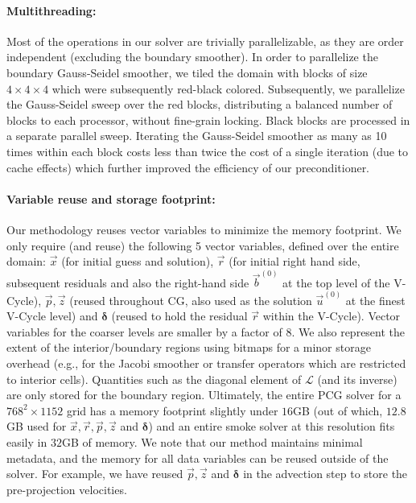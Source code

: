 \paragraph{Multithreading:} Most of the operations in our solver are trivially parallelizable, as they are order independent (excluding the boundary smoother). In order to parallelize the boundary Gauss-Seidel smoother, we tiled the domain with blocks of size $4\times 4\times 4$ which were subsequently red-black
colored. Subsequently, we parallelize the Gauss-Seidel sweep over the red blocks, distributing a balanced number of blocks to each processor, without fine-grain locking. Black blocks are
processed in a separate parallel sweep. 
Iterating the Gauss-Seidel smoother as many as 10 times within each block costs less than twice
the cost of a single iteration (due to cache effects) which further improved the efficiency of our preconditioner.

\paragraph{Variable reuse and storage footprint:} Our methodology reuses vector variables to minimize the memory footprint. We only
require (and reuse) the following 5 vector variables, defined over the entire domain: $\vec{x}$ (for initial guess and solution), $\vec{r}$ (for initial right hand side, subsequent residuals and also
the right-hand side $\vec{b}^{(0)}$ at the top level of the V-Cycle), $\vec{p},\vec{z}$ (reused throughout CG, also used as the solution $\vec{u}^{(0)}$ at the finest V-Cycle level)
and $\boldsymbol{\delta}$ (reused to hold the residual $\vec{r}$ within the V-Cycle). Vector variables
for the coarser levels are smaller by a factor of 8. We also represent the extent of the interior/boundary regions using bitmaps
for a minor storage overhead (e.g., for the Jacobi smoother or transfer operators which are restricted to interior cells). Quantities such as the diagonal element of $\mathcal{L}$ (and
its inverse) are only stored for the boundary region. Ultimately, the entire PCG solver for a $768^2\times 1152$ grid has a memory footprint slightly under $16$GB (out of which, $12.8$GB
used for $\vec{x},\vec{r},\vec{p},\vec{z}$ and $\boldsymbol{\delta}$) and an entire smoke solver at this resolution fits easily in $32$GB of memory. We note that our method maintains minimal
metadata, and the memory for all data variables can be reused outside of the solver. For example, we have reused $\vec{p},\vec{z}$ and $\boldsymbol{\delta}$ in the
advection step to store the pre-projection velocities.


